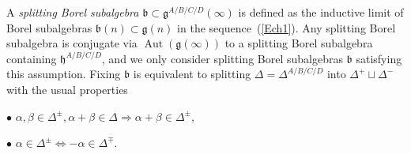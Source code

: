 \documentclass{emsprocart}
\begin{document}

A {\it splitting Borel subalgebra} $\mathfrak b\subset\mathfrak g^{A/B/C/D}(\infty)$ is defined as the inductive limit of Borel subalgebras $\mathfrak b(n)\subset\mathfrak g(n)$ in the sequence~(\ref{Ech1}). Any splitting Borel subalgebra is conjugate via $\operatorname{Aut}(\mathfrak g(\infty))$ to a splitting Borel subalgebra containing $\mathfrak h^{A/B/C/D}$, and we only consider splitting Borel subalgebras $\mathfrak b$ satisfying this assumption. Fixing $\mathfrak b$ is equivalent to splitting $\Delta=\Delta^{A/B/C/D}$ into $\Delta^+\sqcup\Delta^-$ with the usual properties

$\bullet$ $\alpha, \beta\in \Delta^{\pm}, \alpha+\beta\in\Delta \Rightarrow \alpha+\beta\in\Delta^{\pm}$,

$\bullet$ $\alpha\in\Delta^{\pm}\Leftrightarrow-\alpha\in\Delta^{\mp}$.
\end{document}
